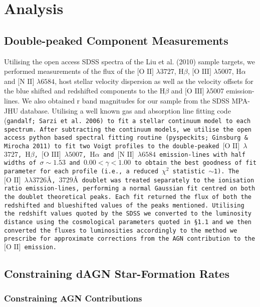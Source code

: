 \section{Analysis}

\subsection{Double-peaked Component Measurements}

Utilising the open access SDSS spectra of the Liu et al. (2010) sample targets, we performed measurements of the flux of the $\text{[O II]}$ $\lambda$$3727$, $\text{H}\beta$, $\text{[O III]}$ $\lambda$$5007$, $\text{H}\alpha$ and $\text{[N II]}$ $\lambda$$6584$, host stellar velocity dispersion as well as the velocity offsets for the blue shifted and redshifted components to the $\text{H}\beta$ and $\text{[O III]}$ λ5007 emission-lines. We also obtained r band magnitudes for our sample from the SDSS MPA-JHU database. Utilising a well known gas and absorption line fitting code (\tt{gandalf}; Sarzi et al. 2006) to fit a stellar continuum model to each spectrum. After subtracting the continuum models, we utilise the open access python based spectral fitting routine (\tt{pyspeckits}; Ginsburg \& Mirocha 2011) to fit two Voigt profiles to the double-peaked $\text{[O II]}$ $\lambda$$3727$, $\text{H}\beta$, $\text{[O III]}$ $\lambda$$5007$, $\text{H}\alpha$ and $\text{[N II]}$ $\lambda$$6584$ emission-lines with half widths of $\sigma\sim{1.53}$ and ${0.00}<{\gamma}<{1.00}$ to obtain the best goodness of fit parameter for each profile (i.e., a reduced $\chi^{2}$ statistic $\sim$1). The $\text{[O II]}$ $\lambda\lambda$$3726Å$, $3729Å$ doublet was treated separately to the ionisation ratio emission-lines, performing a normal Gaussian fit centred on both the doublet theoretical peaks. Each fit returned the flux of both the redshifted and blueshifted values of the peaks mentioned. Utilising the redshift values quoted by the SDSS we converted to the luminosity distance using the cosmological parameters quoted in §1.1 and we then converted the fluxes to luminosities accordingly to the method we prescribe for approximate corrections from the AGN contribution to the $\text{[O II]}$ emission.

\subsection{Constraining dAGN Star-Formation Rates}
\subsubsection{Constraining AGN Contributions}

